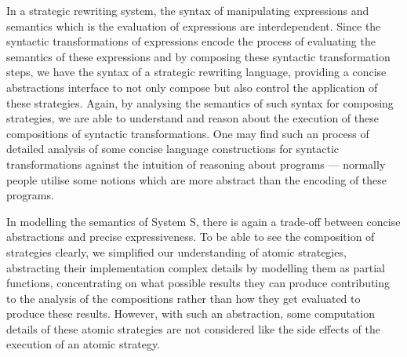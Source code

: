 In a strategic rewriting system, the syntax of manipulating expressions and semantics which is the evaluation of expressions are interdependent. Since the syntactic transformations of expressions encode the process of evaluating the semantics of these expressions and by composing these syntactic transformation steps, we have the syntax of a strategic rewriting language, providing a concise abstractions interface to not only compose but also control the application of these strategies. Again, by analysing the semantics of such syntax for composing strategies, we are able to understand and reason about the execution of these compositions of syntactic transformations. One may find such an process of detailed analysis of some concise language constructions for syntactic transformations against the intuition of reasoning about programs --- normally people utilise some notions which are more abstract than the encoding of these programs.

In modelling the semantics of System S, there is again a trade-off between concise abstractions and precise expressiveness. To be able to see the composition of strategies clearly, we simplified our understanding of atomic strategies, abstracting their implementation complex details by modelling them as partial functions, concentrating on what possible results they can produce contributing to the analysis of the compositions rather than how they get evaluated to produce these results. However, with such an abstraction, some computation details of these atomic strategies are not considered like the side effects of the execution of an atomic strategy.


